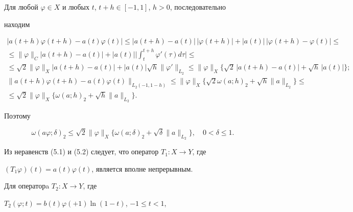 Для любой $\varphi\in X$ и любых $t$, $t+h\in[-1, 1]$, $h>0$, последовательно


находим


\begin{gather*}


| a(t+h)\varphi(t+h)-a(t)\varphi(t)|\leq| a(t+h)-a(t)|\,


|\varphi(t+h)|+| a(t)|\,|\varphi(t+h)-\varphi(t)|\leq \\


%


\leq\|\varphi\|_C| a(t+h)-a(t)|+| a(t)|\bigg|\int_


t^{t+h}\varphi'(\tau)d\tau\bigg|\leq \\


%


\le \sqrt{2}\|\varphi\|_X | a(t+h)-a(t)|+


| a(t)|\sqrt{h}\|\varphi'\|_{L_2}\leq\|\varphi\|_X


\{\sqrt{2}\,| a(t+h)-a(t)|+\sqrt{h}\,| a(t)|\};\\


%


\| a(t+h)\varphi(t+h)-a(t)\varphi(t)\|_{L_2(-1, 1-h)}\leq\|


\varphi\|_X\{\sqrt{2}\omega(a;h)_2+\sqrt{h}\| a\|_{L_2}\}\leq \\


%


\leq\sqrt{2}\|\varphi\|_X\{\omega(a;h)_2+\sqrt{h}\| a \|_{L_2}\}. 


\end{gather*}


Поэтому


\begin{equation}


\omega(a\varphi;\delta)_2\leq\sqrt{2}\|\varphi\|_X\{\omega


(a;\delta)_2+\sqrt{\delta}\| a\|_{L_2}\}, \quad 0<\delta\leq 1. 


\end{equation}





Из неравенств (5.1) и (5.2) следует, что оператор $T_1:X\to Y$, где


$(T_1\varphi)(t)=a(t)\varphi(t)$, является вполне непрерывным. 





Для операторa $T_2:X\to Y$, где 


$T_2(\varphi;t)=b(t)\varphi(+1)\ln(1-t)$, $-1\leq t<1$, 


